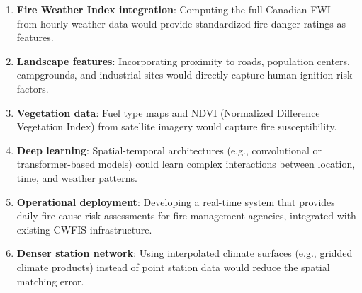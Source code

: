 \documentclass[sigconf,nonacm]{acmart}
\begin{document}
\begin{enumerate}
    \item \textbf{Fire Weather Index integration}: Computing the full Canadian FWI~\cite{vanwagner1987} from hourly weather data would provide standardized fire danger ratings as features.
    \item \textbf{Landscape features}: Incorporating proximity to roads, population centers, campgrounds, and industrial sites would directly capture human ignition risk factors.
    \item \textbf{Vegetation data}: Fuel type maps and NDVI (Normalized Difference Vegetation Index) from satellite imagery would capture fire susceptibility.
    \item \textbf{Deep learning}: Spatial-temporal architectures (e.g., convolutional or transformer-based models) could learn complex interactions between location, time, and weather patterns.
    \item \textbf{Operational deployment}: Developing a real-time system that provides daily fire-cause risk assessments for fire management agencies, integrated with existing CWFIS infrastructure.
    \item \textbf{Denser station network}: Using interpolated climate surfaces (e.g., gridded climate products) instead of point station data would reduce the spatial matching error.
\end{enumerate}



\end{document}
